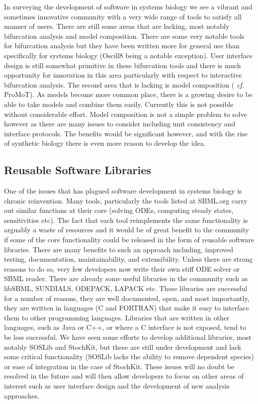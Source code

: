 \documentclass[12pt]{article}
\begin{document}
In surveying the development of software in systems biology we see a
vibrant and sometimes innovative community with a very wide range of
tools to satisfy all manner of users. There are still some areas
that are lacking, most notably bifurcation analysis and model
composition. There are some very notable tools for bifurcation
analysis but they have been written more for general use than
specifically for systems biology (Oscill8 being a notable
exception). User interface design is still somewhat primitive in
these bifurcation tools and there is much opportunity for innovation
in this area particularly with respect to interactive bifurcation
analysis. The second area that is lacking is model composition ({\em
cf.} ProMoT). As models become more common place, there is a growing
desire to be able to take models and combine them easily. Currently
this is not possible without considerable effort. Model composition
is not a simple problem to solve however as there are many issues to
consider including unit consistency and interface protocols. The
benefits would be significant however, and with the rise of
synthetic biology there is even more reason to develop the idea.

\subsection{Reusable Software Libraries}

One of the issues that has plagued software development in systems
biology is chronic reinvention. Many tools, particularly the tools
listed at SBML.org carry out similar functions at their core
(solving ODEs, computing steady states, sensitivities etc). The fact
that each tool reimplements the same functionality is arguably a
waste of resources and it would be of great benefit to the community
if some of the core functionality could be released in the form of
reusable software libraries. There are many benefits to such an
approach including, improved testing, documentation,
maintainability, and extensibility. Unless there are strong reasons
to do so, very few developers now write their own stiff ODE solver
or SBML reader. There are already some useful libraries in the community such as
libSBML, SUNDIALS, ODEPACK, LAPACK etc. These libraries are
successful for a number of reasons, they are well documented, open,
and most importantly, they are written in languages (C and FORTRAN)
that make it easy to interface them to other programming languages.
Libraries that are written in other languages, such as Java or C++,
or where a C interface is not exposed, tend to be less successful.
We have seen some efforts to develop additional libraries, most
notably SOSLib and StochKit, but these are still under development
and lack some critical functionality (SOSLib lacks the ability to
remove dependent species) or ease of integration in the case of
StochKit. These issues will no doubt be resolved in the future and
will then allow developers to focus on other areas of interest such
as user interface design and the development of new analysis
approaches.
\end{document}
